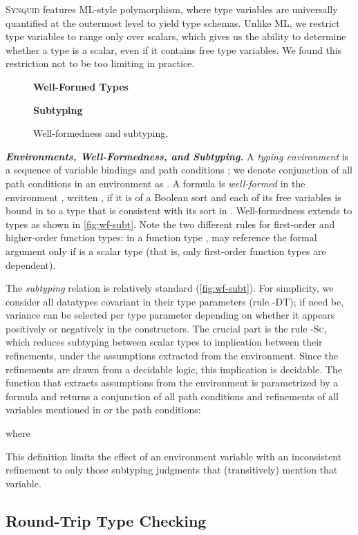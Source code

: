 \documentclass[10pt,preprint]{sigplanconf-pldi16}
\theoremstyle{definition}
\newcommand{\custompar}[1]{\parskip 0pt \textbf{\textit{#1}}}
\newcommand{\lang}{\textsc{Synquid}\xspace}
\begin{document}
\lang features ML-style polymorphism, where type variables are universally quantified at the outermost level to yield type schemas.
Unlike ML, we restrict type variables to range only over scalars,
which gives us the ability to determine whether a type is a scalar, even if it contains free type variables.
We found this restriction not to be too limiting in practice.

\begin{figure}
\small
\textbf{Well-Formed Types}\quad

\textbf{Subtyping}\quad

\caption{Well-formedness and subtyping.}\label{fig:wf-subt}
\end{figure}

\custompar{Environments, Well-Formedness, and Subtyping.}
A \emph{typing environment}  is a sequence of
variable bindings  and path conditions ;
we denote conjunction of all path conditions in an environment as .
A formula  is \emph{well-formed} in the environment ,
written ,
if it is of a Boolean sort and each of its free variables is bound in  to a type that is consistent with its sort in .  
Well-formedness extends to types as shown in \autoref{fig:wf-subt}.
Note the two different rules for first-order and higher-order function types:
in a function type ,  may reference the formal argument  only if  is a scalar type
(that is, only first-order function types are dependent).

The \emph{subtyping} relation  is relatively standard (\autoref{fig:wf-subt}).
For simplicity, we consider all datatypes covariant in their type parameters (rule \textsc{-DT});
if need be, variance can be selected per type parameter 
depending on whether it appears positively or negatively in the constructors.
The crucial part is the rule \textsc{-Sc}, which reduces subtyping between scalar types to implication between their refinements,
under the assumptions extracted from the environment.
Since the refinements are drawn from a decidable logic, this implication is decidable.
The function that extracts assumptions from the environment is parametrized by a formula 
and returns a conjunction of all path conditions and refinements of all variables mentioned in  or the path conditions:

where

This definition limits the effect of an environment variable with an inconsistent refinement
to only those subtyping judgments that (transitively) mention that variable.


\subsection{Round-Trip Type Checking}\label{sec:theory:rules}
\end{document}
